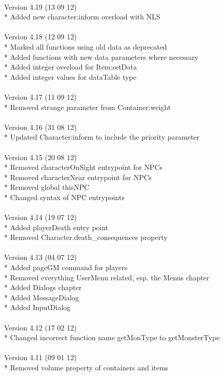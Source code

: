 \documentclass[a4paper,10pt,makeidx]{scrreprt}
\begin{document}
\\
Version 4.19 (13 09 12)\\
* Added new character:inform overload with NLS\\
\\
Version 4.18 (12 09 12)\\
* Marked all functions using old data as deprecated\\
* Added functions with new data parameters where necessary\\
* Added integer overload for Item:setData\\
* Added integer values for dataTable type\\
\\
Version 4.17 (11 09 12)\\
* Removed strange parameter from Container:weight\\
\\
Version 4.16 (31 08 12)\\
* Updated Character:inform to include the priority parameter\\
\\
Version 4.15 (20 08 12)\\
* Removed characterOnSight entrypoint for NPCs\\
* Removed characterNear entrypoint for NPCs\\
* Removed global thisNPC\\
* Changed syntax of NPC entrypoints\\
\\
Version 4.14 (19 07 12)\\
* Added playerDeath entry point\\
* Removed Character.death\_consequences property\\ 
\\
Version 4.13 (04 07 12)\\
* Added pageGM command for players\\
* Removed everything UserMenu related, esp. the Menus chapter\\
* Added Dialogs chapter\\
* Added MessageDialog\\
* Added InputDialog\\
\\
Version 4.12 (17 02 12)\\
* Changed incorrect function name getMonType to getMonsterType\\
\\
Version 4.11 (09 01 12)\\
* Removed volume property of containers and items\\
\end{document}
